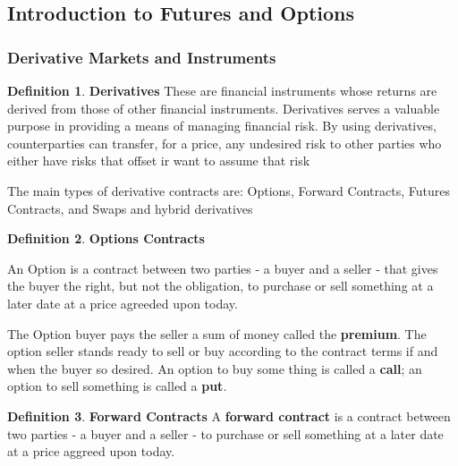 \documentclass{book}
\theoremstyle{definition}
\newtheorem{definition}{Definition}[section]
\theoremstyle{remark}
\begin{document}
\subsection{Introduction to Futures and Options}
\subsubsection{Derivative Markets and Instruments}
    \begin{definition}{\textbf{Derivatives}}
    These are financial instruments whose returns are derived from those of other financial instruments. Derivatives serves a valuable purpose in providing a means of managing financial risk. By using derivatives, counterparties can transfer, for a price, any undesired risk to other parties who either have risks that offset ir want to assume that risk
    \end{definition}
    
    The main types of derivative contracts are: Options, Forward Contracts, Futures Contracts, and Swaps and hybrid derivatives
    
    \begin{definition} {\textbf{Options Contracts}}
        
        An Option is a contract between two parties - a buyer and a seller - that gives the buyer the right, but not the obligation, to purchase or sell something at a later date at a price agreeded upon today. 
        
        The Option buyer pays the seller a sum of money called the \textbf{premium}. The option seller stands ready to sell or buy according to the contract terms if and when the buyer so desired. An option to buy some thing is called a \textbf{call}; an option to sell something is called a \textbf{put}.
        \end{definition}
        
        \begin{definition}{\textbf{Forward Contracts}}
        A \textbf{forward contract} is a contract between two parties - a buyer and a seller - to purchase or sell something at a later date at a price aggreed upon today.
    \end{definition}
    
\end{document}

